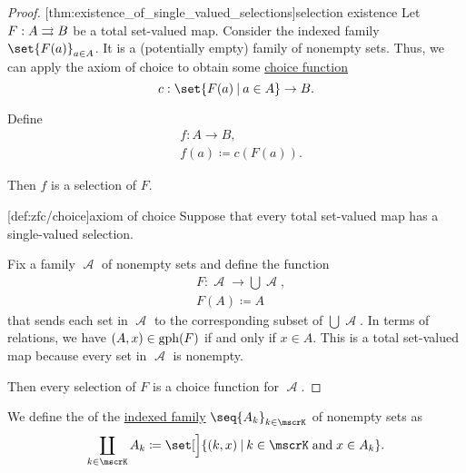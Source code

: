 \begin{proof}
  [thm:existence_of_single_valued_selections]{selection existence} Let \( F: A \rightrightarrows B \) be a total set-valued map. Consider the indexed family \( \set{ F(a) }_{a \in A} \). It is a (potentially empty) family of nonempty sets. Thus, we can apply the axiom of choice to obtain some \hyperref[def:choice_function]{choice function}
  \begin{equation*}
    c: \set{ F(a) \given a \in A } \to B.
  \end{equation*}

  Define
  \begin{equation*}
    \begin{aligned}
      &f: A \to B, \\
      &f(a) \coloneqq c(F(a)).
    \end{aligned}
  \end{equation*}

  Then \( f \) is a selection of \( F \).

  [def:zfc/choice]{axiom of choice} Suppose that every total set-valued map has a single-valued selection.

  Fix a family \( \mscrA \) of nonempty sets and define the function
  \begin{equation*}
    \begin{aligned}
      &F: \mscrA \to \bigcup \mscrA, \\
      &F(A) \coloneqq A
    \end{aligned}
  \end{equation*}
  that sends each set in \( \mscrA \) to the corresponding subset of \( \bigcup \mscrA \). In terms of relations, we have \( (A, x) \in \operatorname{gph}(F) \) if and only if \( x \in A \). This is a total set-valued map because every set in \( \mscrA \) is nonempty.

  Then every selection of \( F \) is a choice function for \( \mscrA \).
\end{proof}

\begin{definition}\label{def:disjoint_union}
  We define the  of the \hyperref[def:cartesian_product/indexed_family]{indexed family} \( \seq{ A_k }_{k \in \mscrK} \) of nonempty sets as
  \begin{equation*}
    \coprod_{k \in \mscrK} A_k \coloneqq \set[\Big]{ (k, x) \given k \in \mscrK \T{and} x \in A_k }.
  \end{equation*}
\end{definition}

